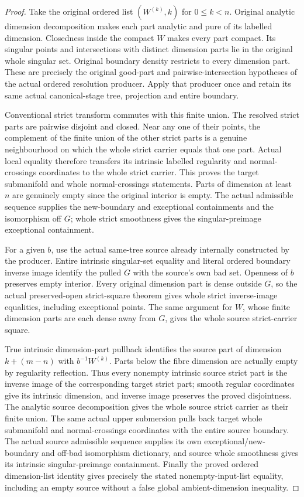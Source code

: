 \begin{proof}
Take the original ordered list $(W^{(k)},k)$ for $0\le k<n$.
Original analytic dimension decomposition makes each part analytic
and pure of its labelled dimension. Closedness inside the compact
$W$ makes every part compact. Its singular points and intersections
with distinct dimension parts lie in the original whole singular
set. Original boundary density restricts to every dimension part.
These are precisely the original good-part and pairwise-intersection
hypotheses of the actual ordered resolution producer. Apply that
producer once and retain its same actual canonical-stage tree,
projection and entire boundary.

Conventional strict transform commutes with this finite union.
The resolved strict parts are pairwise disjoint and closed. Near any
one of their points, the complement of the finite union of the other
strict parts is a genuine neighbourhood on which the whole strict
carrier equals that one part. Actual local equality therefore
transfers its intrinsic labelled regularity and normal-crossings
coordinates to the whole strict carrier. This proves the target
submanifold and whole normal-crossings statements. Parts of dimension
at least $n$ are genuinely empty since the original interior is
empty. The actual admissible sequence supplies the new-boundary and
exceptional containments and the isomorphism off $G$; whole strict
smoothness gives the singular-preimage exceptional containment.

For a given $b$, use the actual same-tree source already internally
constructed by the producer. Entire intrinsic singular-set equality
and literal ordered boundary inverse image identify the pulled $G$
with the source's own bad set. Openness of $b$ preserves empty
interior. Every original dimension part is dense outside $G$, so
the actual preserved-open strict-square theorem gives whole strict
inverse-image equalities, including exceptional points. The same
argument for $W$, whose finite dimension parts are each dense away
from $G$, gives the whole source strict-carrier square.

True intrinsic dimension-part pullback identifies the source part
of dimension $k+(m-n)$ with $b^{-1}W^{(k)}$. Parts below the fibre
dimension are actually empty by regularity reflection. Thus every
nonempty intrinsic source strict part is the inverse image of the
corresponding target strict part; smooth regular coordinates give
its intrinsic dimension, and inverse image preserves the proved
disjointness. The analytic source decomposition gives the whole
source strict carrier as their finite union. The same actual upper
submersion pulls back target whole submanifold and normal-crossings
coordinates with the entire source boundary. The actual source
admissible sequence supplies its own exceptional/new-boundary and
off-bad isomorphism dictionary, and source whole smoothness gives
its intrinsic singular-preimage containment. Finally the proved
ordered dimension-list identity gives precisely the stated
nonempty-input-list equality, including an empty source without a
false global ambient-dimension inequality.
\end{proof}

